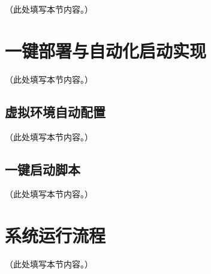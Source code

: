 （此处填写本节内容。）

\section{一键部署与自动化启动实现}

（此处填写本节内容。）

\subsection{虚拟环境自动配置}

（此处填写本节内容。）

\subsection{一键启动脚本}

（此处填写本节内容。）

\section{系统运行流程}

（此处填写本节内容。）
